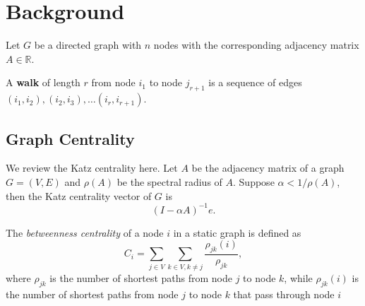\documentclass[12pt]{article}
\theoremstyle{definition}
\def\R{\mathbb{R}}
\begin{document}
\section{Background}
\label{sec:preliminaries}

Let $G$ be a directed graph with $n$ nodes with the corresponding adjacency matrix
$A \in \R$.

A \textbf{walk} of length $r$ from node $i_1$ to node $j_{r+1}$ is a sequence of edges
$(i_1, i_2), (i_2, i_3), \ldots (i_r, i_{r+1})$.


\subsection{Graph Centrality}
\label{sec:katz-centrality}

We review the Katz centrality here.
Let $A$ be the adjacency matrix of a graph $G=(V,E)$ and $\rho(A)$ be the spectral radius of $A$. Suppose $\alpha < 1/ \rho(A)$, then the Katz centrality vector of $G$ is
\[
(I - \alpha A)^{-1}e.
\]

The \emph{betweenness centrality} of a node $i$ in a static graph is defined as
$$
C_i = \sum_{j \in V}\sum_{k \in V, k \ne j} \frac{\rho_{jk}(i)}{\rho_{jk}},
$$
where $\rho_{jk}$ is the number of shortest paths from node $j$ to node $k$, while $\rho_{jk}(i)$ is the number of shortest paths from node $j$ to node $k$ that pass through node $i$



\end{document}
